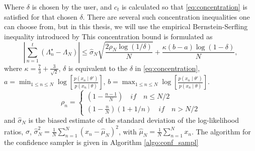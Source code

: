 Where $\delta$ is chosen by the user, and $c_t$ is calculated so that \eqref{eq:concentration} is satisfied for that chosen $\delta$. 
There are several such concentration inequalities one can choose from, but in this thesis, we will use the empirical Bernstein-Serfling inequality introduced by \cite{bardenet2015concentration}
This concentration bound is formulated as 
\begin{equation}\label{eq:BernsteinSerfling}
    \left|\sum_{n = 1}^t \left(\Lambda^{\star}_n - \Lambda_N \right)\right| \leq \hat{\sigma}_N \sqrt{\frac{2\rho_N\log\left(1/\delta\right)}{N}} + \frac{\kappa \left(b-a\right)\log\left(1 - \delta\right)}{N},
\end{equation}{}
where $\kappa = \frac{7}{3} + \frac{3}{\sqrt{2}}$, $\delta$ is equivalent to the $\delta$ in \eqref{eq:concentration}, $a = \min_{1\leq n \leq N}\log\left[\frac{ p\left(x_n\mid \theta'\right)}{ p\left(x_n\mid \theta\right)}\right]$, $b= \max_{1\leq n \leq N} \log\left[\frac{ p\left(x_n\mid \theta'\right)}{ p\left(x_n\mid \theta\right)}\right]$. 
\begin{equation}
    \rho_n =
    \begin{cases}
    \left(1 - \frac{n-1}{N}\right) \quad if \quad n \leq N/2\\
    \left(1  - \frac{n}{N}\right) \left(1 + 1/n\right) \quad if \quad n > N/2
    \end{cases}
\end{equation} and $\hat{\sigma}_N$ is the biased estimate of the standard deviation of the log-likelihood ratios, $\sigma$, $\hat{\sigma}_N^2 = \frac{1}{N}\sum_{n=1}^N \left(x_n - \hat{\mu}_N\right)^2$, with $\hat{\mu}_N = \frac{1}{N}\sum_{n=1}^N x_n$. The algorithm for the confidence sampler is given in Algorithm \ref{algo:conf_sampl}
